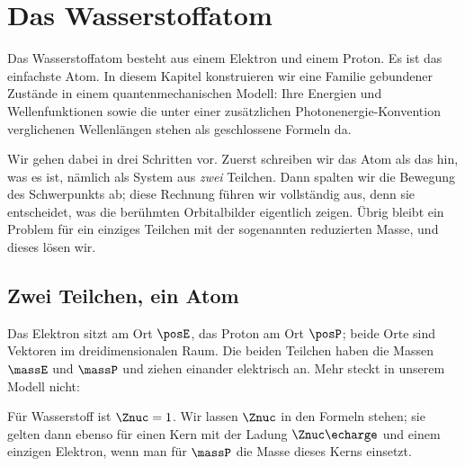 %

\chapter{Das Wasserstoffatom}\label{c11}

Das Wasserstoffatom besteht aus einem Elektron und einem Proton. Es ist das einfachste
Atom. In diesem Kapitel konstruieren wir eine Familie gebundener Zustände in einem
quantenmechanischen Modell: Ihre Energien und Wellenfunktionen sowie die unter einer
zusätzlichen Photonenergie-Konvention verglichenen Wellenlängen stehen als geschlossene
Formeln da.

Wir gehen dabei in drei Schritten vor. Zuerst schreiben wir das Atom als das hin, was es
ist, nämlich als System aus \emph{zwei} Teilchen. Dann spalten wir die Bewegung des
Schwerpunkts ab; diese Rechnung führen wir vollständig aus, denn sie entscheidet, was die
berühmten Orbitalbilder eigentlich zeigen. Übrig bleibt ein Problem für ein einziges
Teilchen mit der sogenannten reduzierten Masse, und dieses lösen wir.

\section{Zwei Teilchen, ein Atom}\label{c11.s1}

Das Elektron sitzt am Ort $\posE$, das Proton am Ort $\posP$; beide Orte sind Vektoren
im dreidimensionalen Raum. Die beiden Teilchen haben die Massen $\massE$ und $\massP$
und ziehen einander elektrisch an. Mehr steckt in unserem Modell nicht:


Für Wasserstoff ist $\Znuc = 1$. Wir lassen $\Znuc$ in den Formeln stehen; sie gelten
dann ebenso für einen Kern mit der Ladung $\Znuc\echarge$ und einem einzigen Elektron,
wenn man für $\massP$ die Masse dieses Kerns einsetzt.


